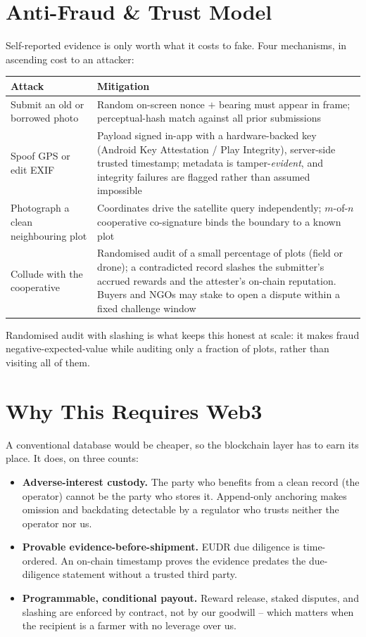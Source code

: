 \documentclass[11pt]{article}
\begin{document}
\section{Anti-Fraud \& Trust Model}
Self-reported evidence is only worth what it costs to fake. Four mechanisms, in ascending cost to an attacker:

\begin{center}
\begin{tabularx}{\linewidth}{@{}l X@{}}
\toprule
\textbf{Attack} & \textbf{Mitigation} \\
\midrule
Submit an old or borrowed photo & Random on-screen nonce $+$ bearing must appear in frame; perceptual-hash match against all prior submissions \\
Spoof GPS or edit EXIF & Payload signed in-app with a hardware-backed key (Android Key Attestation / Play Integrity), server-side trusted timestamp; metadata is tamper-\emph{evident}, and integrity failures are flagged rather than assumed impossible \\
Photograph a clean neighbouring plot & Coordinates drive the satellite query independently; $m$-of-$n$ cooperative co-signature binds the boundary to a known plot \\
Collude with the cooperative & Randomised audit of a small percentage of plots (field or drone); a contradicted record slashes the submitter's accrued rewards and the attester's on-chain reputation. Buyers and NGOs may stake to open a dispute within a fixed challenge window \\
\bottomrule
\end{tabularx}
\end{center}

\vspace{0.4em}
\noindent Randomised audit with slashing is what keeps this honest at scale: it makes fraud negative-expected-value while auditing only a fraction of plots, rather than visiting all of them.

\section{Why This Requires Web3}
A conventional database would be cheaper, so the blockchain layer has to earn its place. It does, on three counts:
\begin{itemize}[leftmargin=1.4em]
  \item \textbf{Adverse-interest custody.} The party who benefits from a clean record (the operator) cannot be the party who stores it. Append-only anchoring makes omission and backdating detectable by a regulator who trusts neither the operator nor us.
  \item \textbf{Provable evidence-before-shipment.} EUDR due diligence is time-ordered. An on-chain timestamp proves the evidence predates the due-diligence statement without a trusted third party.
  \item \textbf{Programmable, conditional payout.} Reward release, staked disputes, and slashing are enforced by contract, not by our goodwill -- which matters when the recipient is a farmer with no leverage over us.
\end{itemize}
\end{document}
